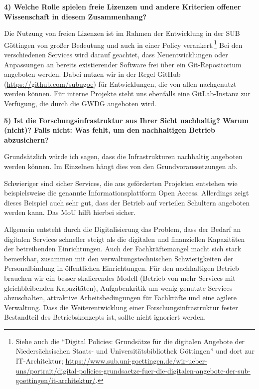 \documentclass[a4paper,
fontsize=11pt,
oneside,
numbers=noperiodatend,
parskip=half-,
bibliography=totoc,
final
]{scrartcl}
\begin{document}
\pagebreak
\textbf{4) Welche Rolle spielen freie Lizenzen und andere Kriterien
offener Wissenschaft in diesem Zusammenhang?}

Die Nutzung von freien Lizenzen ist im Rahmen der Entwicklung in der SUB
Göttingen von großer Bedeutung und auch in einer Policy
verankert.\footnote{Siehe auch die \enquote{Digital Policies: Grundsätze
  für die digitalen Angebote der Niedersächsischen Staats- und
  Universitätsbibliothek Göttingen} und dort zur IT-Architektur;
  \url{https://www.sub.uni-goettingen.de/wir-ueber-uns/portrait/digital-policies-grundsaetze-fuer-die-digitalen-angebote-der-sub-goettingen/it-architektur/}.}
Bei den verschiedenen Services wird darauf geachtet, dass
Neuentwicklungen oder Anpassungen an bereits existierender Software frei
über ein Git-Repositorium angeboten werden. Dabei nutzen wir in der
Regel GitHub (\url{https://github.com/subugoe}) für Entwicklungen, die
von allen nachgenutzt werden können. Für interne Projekte steht uns
ebenfalls eine GitLab-Instanz zur Verfügung, die durch die GWDG
angeboten wird.

\textbf{5) Ist die Forschungsinfrastruktur aus Ihrer Sicht nachhaltig?
Warum (nicht)? Falls nicht: Was fehlt, um den nachhaltigen Betrieb
abzusichern?}

Grundsätzlich würde ich sagen, dass die Infrastrukturen nachhaltig
angeboten werden können. Im Einzelnen hängt dies von den
Grundvoraussetzungen ab.

Schwieriger sind sicher Services, die aus geförderten Projekten
entstehen wie beispielsweise die genannte Informationsplattform Open
Access. Allerdings zeigt dieses Beispiel auch sehr gut, dass der Betrieb
auf verteilen Schultern angeboten werden kann. Das MoU hilft hierbei
sicher.

Allgemein entsteht durch die Digitalisierung das Problem, dass der
Bedarf an digitalen Services schneller steigt als die digitalen und
finanziellen Kapazitäten der betreibenden Einrichtungen. Auch der
Fachkräftemangel macht sich stark bemerkbar, zusammen mit den
verwaltungstechnischen Schwierigkeiten der Personalbindung in
öffentlichen Einrichtungen. Für den nachhaltigen Betrieb brauchen wir
ein besser skalierendes Modell (Betrieb von mehr Services mit
gleichbleibenden Kapazitäten), Aufgabenkritik um wenig genutzte Services
abzuschalten, attraktive Arbeitsbedingungen für Fachkräfte und eine
agilere Verwaltung. Dass die Weiterentwicklung einer
Forschungsinfrastruktur fester Bestandteil des Betriebskonzepts ist,
sollte nicht ignoriert werden.

\end{document}
